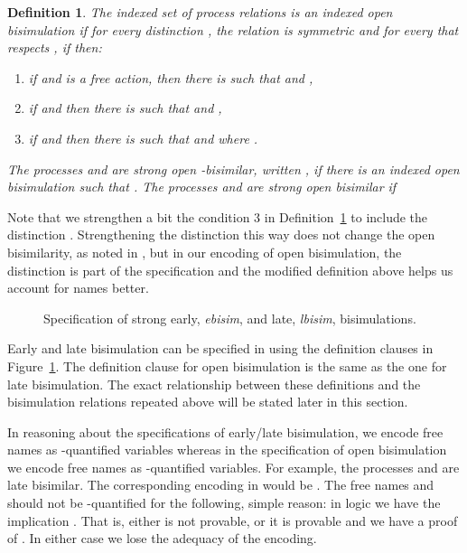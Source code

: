 \documentclass{acmtrans2m}
\newenvironment{definition}{\begin{define} \rm}{\end{define}}
\newtheorem{define}[theorem]{Definition}
\begin{document}
\begin{definition} 
\label{def:obisim}
The indexed set  of process relations is an
{\em indexed
open bisimulation} if for every distinction , the relation
 is symmetric and for every 
 that respects , if  then:
\begin{enumerate}
\item if  and  is a free action,
  then there is  such that
   and ,
\item if  and  
  then there is  such that
   and ,
\item \label{def:obisim3} if  and  
  then there is 
  such that  and 
   where .
\end{enumerate}
The processes  and  are {\em strong open -bisimilar},
written , if there is an indexed open bisimulation
 such that . The processes  and  are
{\em strong open bisimilar} if 
\end{definition}

Note that we strengthen a bit the condition 3 in
Definition~\ref{def:obisim} to include the distinction .  Strengthening the distinction this way does not change the
open bisimilarity, as noted in \cite{sangiorgi01}, but in our encoding
of open bisimulation, the distinction  is part of the specification
and the modified definition above helps us account for names better.

\begin{figure}
{\small


}
\caption{Specification of strong early, {\sl ebisim}, and late, {\sl
    lbisim}, bisimulations.}
\label{bisim}
\end{figure}

Early and late bisimulation can be specified in  using the
definition clauses in Figure~\ref{bisim}.  The definition clause for
open bisimulation is the same as the one for late bisimulation.  The
exact relationship between these definitions and the bisimulation
relations repeated above will be stated later in this section.

In reasoning about the specifications of early/late bisimulation, we encode
free names as -quantified variables whereas in the
specification of open bisimulation we encode free names as
-quantified variables.  For example, the processes  and  are late
bisimilar. The corresponding encoding in  would be .  The free names  and  should
not be -quantified for the following, simple reason: in logic
we have the implication .  That is, either
 is not provable, or it is
provable and we have a proof of . In
either case we lose the adequacy of the encoding.
\end{document}
